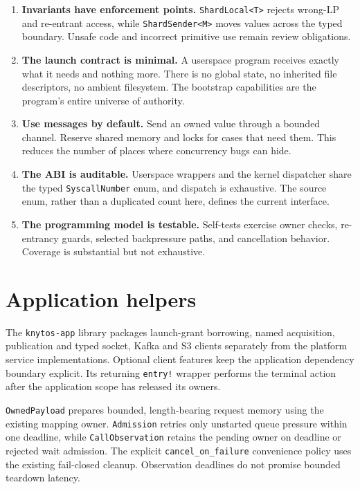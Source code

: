 \begin{enumerate}
    \item \textbf{Invariants have enforcement points.} \texttt{ShardLocal<T>}
        rejects wrong-LP and re-entrant access, while \texttt{ShardSender<M>} moves
        values across the typed boundary. Unsafe code and incorrect primitive use
        remain review obligations.

    \item \textbf{The launch contract is minimal.} A userspace program receives
        exactly what it needs and nothing more. There is no global state, no
        inherited file descriptors, no ambient filesystem. The bootstrap
        capabilities are the program's entire universe of authority.

    \item \textbf{Use messages by default.} Send an owned value through a bounded
        channel. Reserve shared memory and locks for cases that need them. This reduces
        the number of places where concurrency bugs can hide.

    \item \textbf{The ABI is auditable.} Userspace wrappers and the kernel
        dispatcher share the typed \texttt{SyscallNumber} enum, and dispatch is
        exhaustive. The source enum, rather than a duplicated count here, defines
        the current interface.

    \item \textbf{The programming model is testable.} Self-tests exercise
        owner checks, re-entrancy guards, selected backpressure paths, and
        cancellation behavior. Coverage is substantial but not exhaustive.
\end{enumerate}

\section{Application helpers}

The \texttt{knytos-app} library packages launch-grant borrowing, named
acquisition, publication and typed socket, Kafka and S3 clients separately
from the platform service implementations. Optional client features keep the
application dependency boundary explicit. Its returning \texttt{entry!}
wrapper performs the terminal action after the application scope has released
its owners.

\texttt{OwnedPayload} prepares bounded, length-bearing request memory using
the existing mapping owner. \texttt{Admission} retries only unstarted queue
pressure within one deadline, while \texttt{CallObservation} retains the pending
owner on deadline or rejected wait admission. The explicit
\texttt{cancel\_on\_failure} convenience policy uses the existing fail-closed
cleanup. Observation deadlines do not promise bounded teardown latency.

